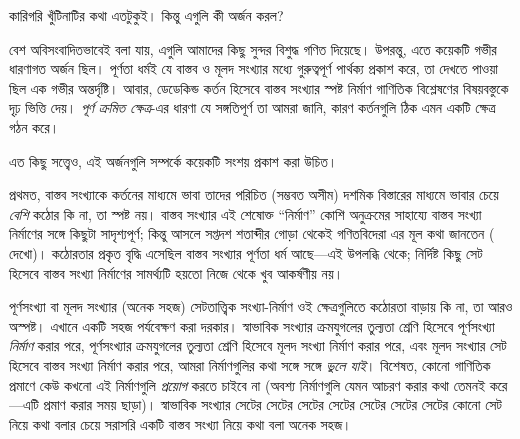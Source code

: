 \documentclass[../../../include/open-logic-section]{subfiles}
\begin{document}

কারিগরি খুঁটিনাটির কথা এতটুকুই। কিন্তু এগুলি কী অর্জন করল?

বেশ অবিসংবাদিতভাবেই বলা যায়, এগুলি আমাদের কিছু {সুন্দর} বিশুদ্ধ গণিত দিয়েছে। উপরন্তু, এতে কয়েকটি গভীর ধারণাগত অর্জন ছিল। পূর্ণতা ধর্মই যে বাস্তব ও মূলদ সংখ্যার মধ্যে গুরুত্বপূর্ণ পার্থক্য প্রকাশ করে, তা দেখতে পাওয়া ছিল এক গভীর অন্তর্দৃষ্টি। আবার, ডেডেকিন্ড কর্তন হিসেবে বাস্তব সংখ্যার স্পষ্ট নির্মাণ গাণিতিক বিশ্লেষণের বিষয়বস্তুকে দৃঢ় ভিত্তি দেয়। \emph{পূর্ণ ক্রমিত ক্ষেত্র}-এর ধারণা যে সঙ্গতিপূর্ণ তা আমরা জানি, কারণ কর্তনগুলি ঠিক এমন একটি ক্ষেত্র গঠন করে।

এত কিছু সত্ত্বেও, এই অর্জনগুলি সম্পর্কে কয়েকটি সংশয় প্রকাশ করা উচিত।

প্রথমত, বাস্তব সংখ্যাকে কর্তনের মাধ্যমে ভাবা তাদের পরিচিত (সম্ভবত অসীম) দশমিক বিস্তারের মাধ্যমে ভাবার চেয়ে \emph{বেশি} কঠোর কি না, তা স্পষ্ট নয়। বাস্তব সংখ্যার এই শেষোক্ত ``নির্মাণ'' কোশি অনুক্রমের সাহায্যে বাস্তব সংখ্যা নির্মাণের সঙ্গে কিছুটা সাদৃশ্যপূর্ণ; কিন্তু আসলে সপ্তদশ শতাব্দীর গোড়া থেকেই গণিতবিদেরা এর মূল কথা জানতেন ( দেখো)। কঠোরতার প্রকৃত বৃদ্ধি এসেছিল বাস্তব সংখ্যার পূর্ণতা ধর্ম আছে—এই উপলব্ধি থেকে; নির্দিষ্ট কিছু সেট হিসেবে বাস্তব সংখ্যা নির্মাণের সামর্থ্যটি হয়তো নিজে থেকে খুব আকর্ষণীয় নয়।

পূর্ণসংখ্যা বা মূলদ সংখ্যার (অনেক সহজ) সেটতাত্ত্বিক সংখ্যা-নির্মাণ ওই ক্ষেত্রগুলিতে কঠোরতা বাড়ায় কি না, তা আরও অস্পষ্ট। এখানে একটি সহজ পর্যবেক্ষণ করা দরকার। স্বাভাবিক সংখ্যার ক্রমযুগলের তুল্যতা শ্রেণি হিসেবে পূর্ণসংখ্যা \emph{নির্মাণ} করার পরে, পূর্ণসংখ্যার ক্রমযুগলের তুল্যতা শ্রেণি হিসেবে মূলদ সংখ্যা নির্মাণ করার পরে, এবং মূলদ সংখ্যার সেট হিসেবে বাস্তব সংখ্যা নির্মাণ করার পরে, আমরা নির্মাণগুলির কথা সঙ্গে সঙ্গে \emph{ভুলে যাই}। বিশেষত, কোনো গাণিতিক প্রমাণে কেউ কখনো এই নির্মাণগুলি \emph{প্রয়োগ} করতে চাইবে না (অবশ্য নির্মাণগুলি যেমন আচরণ করার কথা তেমনই করে—এটি প্রমাণ করার সময় ছাড়া)। স্বাভাবিক সংখ্যার সেটের সেটের সেটের সেটের সেটের সেটের সেটের কোনো সেট নিয়ে কথা বলার চেয়ে সরাসরি একটি বাস্তব সংখ্যা নিয়ে কথা বলা অনেক সহজ।
%
%
%
\end{document}
